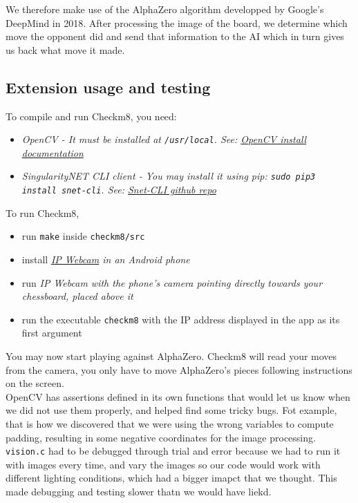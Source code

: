 \documentclass[11pt]{article}
\begin{document}
We therefore make use of the AlphaZero algorithm developped by Google's DeepMind 
in 2018. After processing
the image of the board, we determine which move the opponent did and send that
information to the AI which in turn gives us back what move it made.\\

\subsection{Extension usage and testing}
To compile and run Checkm8, you need:
\begin{itemize}
\item \em OpenCV \em - It must be installed at
\texttt{/usr/local}. See:
\href{https://docs.opencv.org/3.4.6/d7/d9f/tutorial_linux_install.html}{OpenCV install documentation}
\item  \em SingularityNET CLI \em client - You may install it using \em pip\em: 
\texttt{sudo pip3 install snet-cli}. See: 
\href{https://github.com/singnet/snet-cli}{Snet-CLI github repo}

\end{itemize}
To run Checkm8, 
\begin{itemize}
  \item run \texttt{make} inside \texttt{checkm8/src} 
  \item install \em \href{https://play.google.com/store/apps/details?id=com.pas.webcam&hl=en_GB}{IP Webcam} \em
  in an Android phone
  \item run \em IP Webcam \em with the phone's camera pointing directly towards your chessboard,
  placed above it
  \item run the executable \texttt{checkm8} with the IP address displayed
  in the app as its first argument
\end{itemize}
You may now start playing against AlphaZero. Checkm8 will read your moves
from the camera, you only have to move AlphaZero's pieces following 
instructions on the screen.\\
OpenCV has assertions defined in its own functions that would let us 
know when we did not use them properly, and helped find some tricky bugs.
Fot example, that is how we discovered that we were using the wrong variables
to compute padding, resulting in some negative coordinates for the image
processing.\\
\texttt{vision.c} had to be debugged through trial and error because we
had to run it with images every time, and vary the images so our code would
work with different lighting conditions, which had a bigger imapct that we 
thought. This made debugging and testing slower thatn we would have liekd.\\
\end{document}
